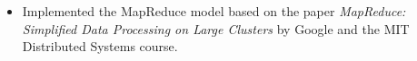 \documentclass{resume}
\begin{document}



\begin{itemize}
  \item Implemented the MapReduce model based on the paper \textit{MapReduce: Simplified Data Processing on Large Clusters} by Google and the MIT Distributed Systems course.
\end{itemize}

\end{document}
